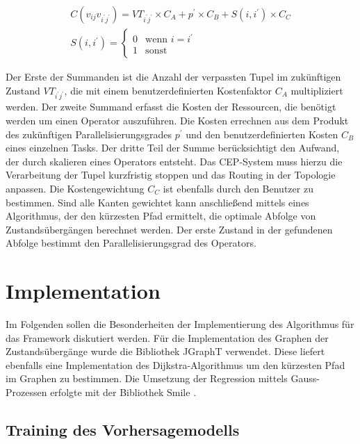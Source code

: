 \begin{equation*}
\begin{split}
C(v_{ij}v_{i^\prime j^\prime}) = VT_{i^\prime j^\prime} \times  C_A + p^\prime \times C_B + S(i,i^\prime) \times C_C \\
   S(i,i^\prime) =
   \begin{cases}
     0 & \text{wenn } i = i^\prime \\
     1 & \text{sonst} 
   \end{cases}
\end{split}
\end{equation*}


Der Erste der Summanden ist die Anzahl der verpassten Tupel im zukünftigen Zustand \(VT_{i^\prime j^\prime}\), die mit einem benutzerdefinierten Kostenfaktor \(C_A\) multipliziert werden.
Der zweite Summand erfasst die Kosten der Ressourcen, die benötigt werden um einen Operator auszuführen.
Die Kosten errechnen aus dem Produkt des zukünftigen Parallelisierungsgrades \(p^\prime\) und den benutzerdefinierten Kosten \(C_B\) eines einzelnen Tasks.
Der dritte Teil der Summe berücksichtigt den Aufwand, der durch skalieren eines Operators entsteht.
Das CEP-System muss hierzu die Verarbeitung der Tupel kurzfristig stoppen und das Routing in der Topologie anpassen.
Die Kostengewichtung \(C_C\) ist ebenfalls durch den Benutzer zu bestimmen.
Sind alle Kanten gewichtet kann anschließend mittels eines Algorithmus, der den kürzesten Pfad ermittelt, die optimale Abfolge von Zustandsübergängen berechnet werden.
Der erste Zustand in der gefundenen Abfolge bestimmt den Parallelisierungsgrad des Operators.

\section{Implementation}

Im Folgenden sollen die Besonderheiten der Implementierung des Algorithmus für das Framework diskutiert werden.
Für die Implementation des Graphen der Zustandsübergänge wurde die Bibliothek JGraphT \cite{noauthor_welcome_nodate} verwendet.
Diese liefert ebenfalls eine Implementation des Dijkstra-Algorithmus um den kürzesten Pfad im Graphen zu bestimmen.
Die Umsetzung der Regression mittels Gauss-Prozessen erfolgte mit der Bibliothek Smile \cite{noauthor_smile_nodate}.

\subsection{Training des Vorhersagemodells}

